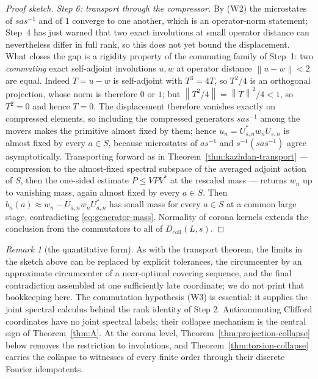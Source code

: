 \documentclass[11pt]{amsart}
\theoremstyle{definition}
\theoremstyle{remark}
\newtheorem{remark}[theorem]{Remark}
\theoremstyle{plain}
\newcommand{\opnorm}[1]{\left\lVert #1\right\rVert}
\begin{document}
\begin{proof}[Proof sketch]
\emph{Step 6: transport through the compressor.}  By (W2) the
microstates of $sas^{-1}$ and of $1$ converge to one another, which is
an operator-norm statement; Step~4 has just warned that two exact
involutions at small operator distance can nevertheless differ in full
rank, so this does not yet bound the displacement.  What closes the gap
is a rigidity property of the commuting family of Step~1: two
\emph{commuting} exact self-adjoint involutions $u,w$ at operator
distance $\opnorm{u-w}<2$ are equal.  Indeed $T=u-w$ is self-adjoint
with $T^3=4T$, so $T^2/4$ is an orthogonal projection, whose norm is
therefore $0$ or $1$; but $\opnorm{T^2/4}=\opnorm{T}^2/4<1$, so
$T^2=0$ and hence $T=0$.  The displacement therefore vanishes exactly
on compressed elements, so including the
compressed generators $sas^{-1}$ among the movers makes the primitive
almost fixed by them; hence $u_n=U_{s,n}^{*}w_nU_{s,n}$ is almost
fixed by every $a\in S$, because microstates of $as^{-1}$ and
$s^{-1}(sas^{-1})$ agree asymptotically.  Transporting forward as in
Theorem~\ref{thm:kazhdan-transport} --- compression to the
almost-fixed spectral subspace of the averaged adjoint action of $S$,
then the one-sided estimate $P\le VPV^{*}$ at the rescaled mass ---
returns $w_n$ up to vanishing mass, again almost fixed by every
$a\in S$.  Then $b_n(a)\approx w_n-U_{a,n}w_nU_{a,n}^{*}$ has small
mass for every $a\in S$ at a common large stage, contradicting
\eqref{eq:generator-mass}.  Normality of corona kernels extends the
conclusion from the commutators to all of $D_{\mathrm{coll}}(L,s)$.
\end{proof}

\begin{remark}[the quantitative form]\label{rem:collapse-finite-stage}
As with the transport theorem, the limits in the sketch above can be
replaced by explicit tolerances, the circumcenter by an approximate
circumcenter of a near-optimal covering sequence, and the final
contradiction assembled at one sufficiently late coordinate; we do not
print that bookkeeping here.  The commutation hypothesis (W3) is
essential: it supplies the joint spectral calculus behind the rank
identity of Step 2.  Anticommuting Clifford coordinates have no joint
spectral labels; their collapse mechanism is the central sign of
Theorem~\ref{thm:A}.  At the corona level,
Theorem~\ref{thm:projection-collapse} below removes the restriction to
involutions, and Theorem~\ref{thm:torsion-collapse} carries the
collapse to witnesses of every finite order through their discrete
Fourier idempotents.
\end{remark}
\end{document}
